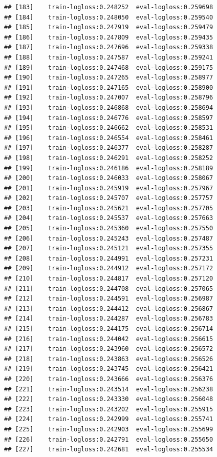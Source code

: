 \documentclass[
]{article}
\begin{document}
\begin{verbatim}
## [183]    train-logloss:0.248252  eval-logloss:0.259698 
## [184]    train-logloss:0.248050  eval-logloss:0.259540 
## [185]    train-logloss:0.247919  eval-logloss:0.259479 
## [186]    train-logloss:0.247809  eval-logloss:0.259435 
## [187]    train-logloss:0.247696  eval-logloss:0.259338 
## [188]    train-logloss:0.247587  eval-logloss:0.259241 
## [189]    train-logloss:0.247468  eval-logloss:0.259175 
## [190]    train-logloss:0.247265  eval-logloss:0.258977 
## [191]    train-logloss:0.247165  eval-logloss:0.258900 
## [192]    train-logloss:0.247007  eval-logloss:0.258796 
## [193]    train-logloss:0.246868  eval-logloss:0.258694 
## [194]    train-logloss:0.246776  eval-logloss:0.258597 
## [195]    train-logloss:0.246662  eval-logloss:0.258531 
## [196]    train-logloss:0.246554  eval-logloss:0.258461 
## [197]    train-logloss:0.246377  eval-logloss:0.258287 
## [198]    train-logloss:0.246291  eval-logloss:0.258252 
## [199]    train-logloss:0.246186  eval-logloss:0.258189 
## [200]    train-logloss:0.246033  eval-logloss:0.258067 
## [201]    train-logloss:0.245919  eval-logloss:0.257967 
## [202]    train-logloss:0.245707  eval-logloss:0.257757 
## [203]    train-logloss:0.245621  eval-logloss:0.257705 
## [204]    train-logloss:0.245537  eval-logloss:0.257663 
## [205]    train-logloss:0.245360  eval-logloss:0.257550 
## [206]    train-logloss:0.245243  eval-logloss:0.257487 
## [207]    train-logloss:0.245121  eval-logloss:0.257355 
## [208]    train-logloss:0.244991  eval-logloss:0.257231 
## [209]    train-logloss:0.244912  eval-logloss:0.257172 
## [210]    train-logloss:0.244817  eval-logloss:0.257120 
## [211]    train-logloss:0.244708  eval-logloss:0.257065 
## [212]    train-logloss:0.244591  eval-logloss:0.256987 
## [213]    train-logloss:0.244412  eval-logloss:0.256867 
## [214]    train-logloss:0.244287  eval-logloss:0.256783 
## [215]    train-logloss:0.244175  eval-logloss:0.256714 
## [216]    train-logloss:0.244042  eval-logloss:0.256615 
## [217]    train-logloss:0.243960  eval-logloss:0.256572 
## [218]    train-logloss:0.243863  eval-logloss:0.256526 
## [219]    train-logloss:0.243745  eval-logloss:0.256421 
## [220]    train-logloss:0.243666  eval-logloss:0.256376 
## [221]    train-logloss:0.243514  eval-logloss:0.256238 
## [222]    train-logloss:0.243330  eval-logloss:0.256048 
## [223]    train-logloss:0.243202  eval-logloss:0.255915 
## [224]    train-logloss:0.242999  eval-logloss:0.255741 
## [225]    train-logloss:0.242903  eval-logloss:0.255699 
## [226]    train-logloss:0.242791  eval-logloss:0.255650 
## [227]    train-logloss:0.242681  eval-logloss:0.255534 

\end{verbatim}
\end{document}
